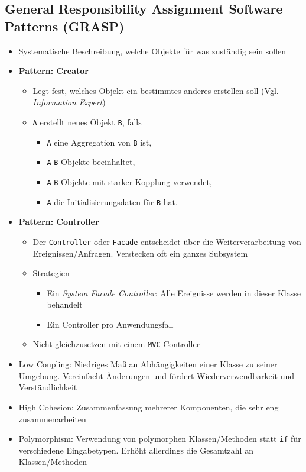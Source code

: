 \subsection{General Responsibility Assignment Software Patterns (GRASP)}
\begin{itemize}
	\item Systematische Beschreibung, welche Objekte für was zuständig sein sollen
	\item \textbf{Pattern: Creator}
	\begin{itemize}
		\item Legt fest, welches Objekt ein bestimmtes anderes erstellen soll (Vgl. \textit{Information Expert})
		\item \texttt{A} erstellt neues Objekt \texttt{B}, falls
		\begin{itemize}
			\item \texttt{A} eine Aggregation von \texttt{B} ist,
			\item \texttt{A} \texttt{B}-Objekte beeinhaltet,
			\item \texttt{A} \texttt{B}-Objekte mit starker Kopplung verwendet,
			\item \texttt{A} die Initialisierungsdaten für \texttt{B} hat.
		\end{itemize}
	\end{itemize}
	\item \textbf{Pattern: Controller}
	\begin{itemize}
		\item Der \texttt{Controller} oder \texttt{Facade} entscheidet über die Weiterverarbeitung von Ereignissen/Anfragen. Verstecken oft ein ganzes Subsystem
		\item Strategien
		\begin{itemize}
			\item Ein \textit{System Facade Controller}: Alle Ereignisse werden in dieser Klasse behandelt
			\item Ein Controller pro Anwendungsfall
		\end{itemize}
		\item Nicht gleichzusetzen mit einem \texttt{MVC}-Controller
	\end{itemize}
	\item Low Coupling: Niedriges Maß an Abhängigkeiten einer Klasse zu seiner Umgebung. Vereinfacht Änderungen und fördert Wiederverwendbarkeit und Verständlichkeit
	\item High Cohesion: Zusammenfassung mehrerer Komponenten, die sehr eng zusammenarbeiten
	\item Polymorphism: Verwendung von polymorphen Klassen/Methoden statt \texttt{if} für verschiedene Eingabetypen. Erhöht allerdings die Gesamtzahl an Klassen/Methoden

\end{itemize}
